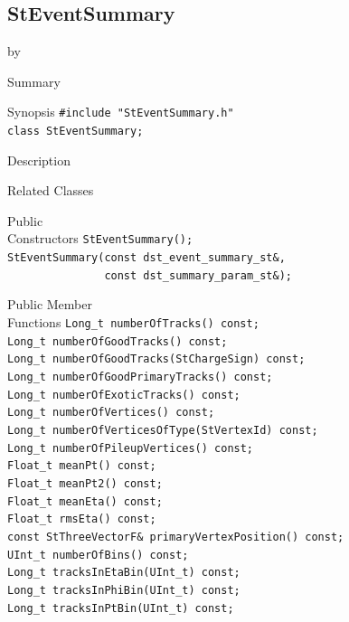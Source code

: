 \documentclass[twoside]{article}
\newcommand{\entrylabel}[1]{\mbox{\textbf{{#1}}}\hfil}%
\newenvironment{entry}
{\begin{list}{}%
    {\renewcommand{\makelabel}{\entrylabel}%
     \setlength{\labelwidth}{90pt}%
     \setlength{\leftmargin}{\labelwidth}
     \advance\leftmargin by \labelsep%
      }%
    }%
  {\end{list}}
\newcommand{\Entrylabel}[1]%
{\raisebox{0pt}[1ex][0pt]{\makebox[\labelwidth][l]%
    {\parbox[t]{\labelwidth}{\hspace{0pt}\textbf{{#1}}}}}}
\newenvironment{Entry}%
{\renewcommand{\entrylabel}{\Entrylabel}\begin{entry}}%
  {\end{entry}}
\begin{document}
\subsection{StEventSummary}
\label{sec:StEventSummary}
\begin{Entry}
\item[Summary]
\item[Synopsis]
    \verb+#include "StEventSummary.h"+\\
    \verb+class StEventSummary;+\\
\item[Description]
\item[Related Classes]
\item[Public\\ Constructors]
    \verb+StEventSummary();+\\
    \verb+StEventSummary(const dst_event_summary_st&,+\\
    \verb+               const dst_summary_param_st&);+\\
\item[Public Member\\ Functions]
    \verb+Long_t numberOfTracks() const;+\\
    \verb+Long_t numberOfGoodTracks() const;+\\
    \verb+Long_t numberOfGoodTracks(StChargeSign) const;+\\
    \verb+Long_t numberOfGoodPrimaryTracks() const;+\\
    \verb+Long_t numberOfExoticTracks() const;+\\
    \verb+Long_t numberOfVertices() const;+\\
    \verb+Long_t numberOfVerticesOfType(StVertexId) const;+\\
    \verb+Long_t numberOfPileupVertices() const;+\\
    \verb+Float_t meanPt() const;+\\
    \verb+Float_t meanPt2() const;+\\
    \verb+Float_t meanEta() const;+\\
    \verb+Float_t rmsEta() const;+\\
    \verb+const StThreeVectorF& primaryVertexPosition() const;+\\
    \verb+UInt_t numberOfBins() const;+\\
    \verb+Long_t tracksInEtaBin(UInt_t) const;+\\
    \verb+Long_t tracksInPhiBin(UInt_t) const;+\\
    \verb+Long_t tracksInPtBin(UInt_t) const;+\\

\end{Entry}
\end{document}
